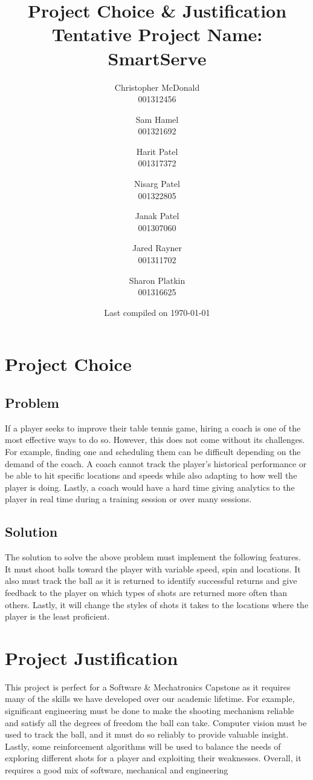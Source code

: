 \documentclass[11pt, oneside]{article}
\title{Project Choice \& Justification \\ Tentative Project Name: SmartServe}
\author{
Christopher McDonald \\ 001312456 \\ \and
Sam Hamel \\ 001321692 \\ \and
Harit Patel \\ 001317372 \\ \and
Nisarg Patel \\ 001322805 \\ \and
Janak Patel \\ 001307060 \\ \and
Jared Rayner \\ 001311702 \\ \and
Sharon Platkin \\ 001316625 \\
}
\date{Last compiled on \today}
\begin{document}
\maketitle
\section*{Project Choice}
\subsection*{Problem}
If a player seeks to improve their table tennis game, hiring a coach is one of the most effective ways to do so. However, this does not come without its challenges. For example, finding one and scheduling them can be difficult depending on the demand of the coach. A coach cannot track the player's historical performance or be able to hit specific locations and speeds while also adapting to how well the player is doing. Lastly, a coach would have a hard time giving analytics to the player in real time during a training session or over many sessions.
\subsection*{Solution}
The solution to solve the above problem must implement the following features. It must shoot balls toward the player with variable speed, spin and locations. It also must track the ball as it is returned to identify successful returns and give feedback to the player on which types of shots are returned more often than others. Lastly, it will change the styles of shots it takes to the locations where the player is the least proficient.
\section*{Project Justification}
This project is perfect for a Software \& Mechatronics Capstone as it requires many of the skills we have developed over our academic lifetime. For example, significant engineering must be done to make the shooting mechanism reliable and satisfy all the degrees of freedom the ball can take. Computer vision must be used to track the ball, and it must do so reliably to provide valuable insight. Lastly, some reinforcement algorithms will be used to balance the needs of exploring different shots for a player and exploiting their weaknesses. Overall, it requires a good mix of software, mechanical and engineering 
\end{document}
